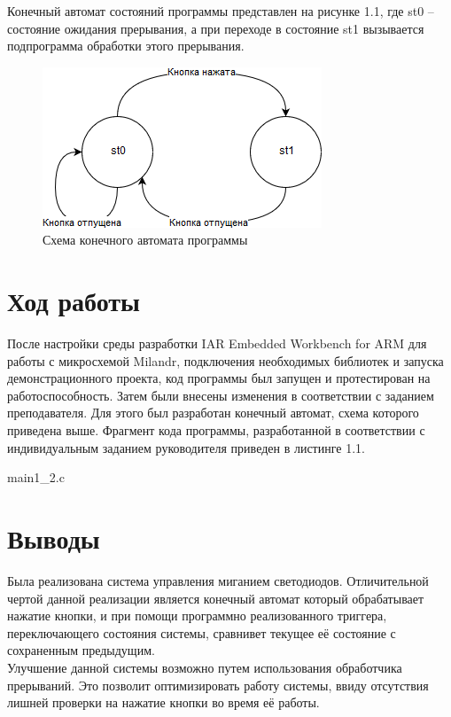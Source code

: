 \documentclass[14pt,a4paper,report]{report}
\begin{document}
Конечный автомат состояний программы представлен на рисунке 1.1, где st0 – состояние ожидания прерывания, а при переходе в состояние st1 вызывается подпрограмма обработки этого прерывания.

\begin{figure}[h!]
	\centering
	\includegraphics[scale = 1]{img/1_1.png}
	\caption{Схема конечного автомата программы}
\end{figure}

\section{Ход работы}

После настройки среды разработки IAR Embedded Workbench for ARM для работы с микросхемой Milandr, подключения необходимых библиотек и запуска демонстрационного проекта, код программы был запущен и протестирован на работоспособность. Затем были внесены изменения в соответствии с заданием преподавателя. Для этого был разработан конечный автомат, схема которого приведена выше. 
Фрагмент кода программы, разработанной в соответствии с индивидуальным заданием руководителя приведен в листинге 1.1. 


		{main1_2.c}


\section{Выводы}
\indent Была реализована система управления миганием светодиодов. Отличительной чертой данной реализации является конечный автомат который обрабатывает нажатие кнопки, и при помощи программно реализованного триггера, переключающего состояния системы, сравнивет текущее её состояние с сохраненным предыдущим. \\
\indent Улучшение данной системы возможно путем использования обработчика прерываний. Это позволит оптимизировать работу системы, ввиду отсутствия лишней проверки на нажатие кнопки во время её работы.
\end{document}
